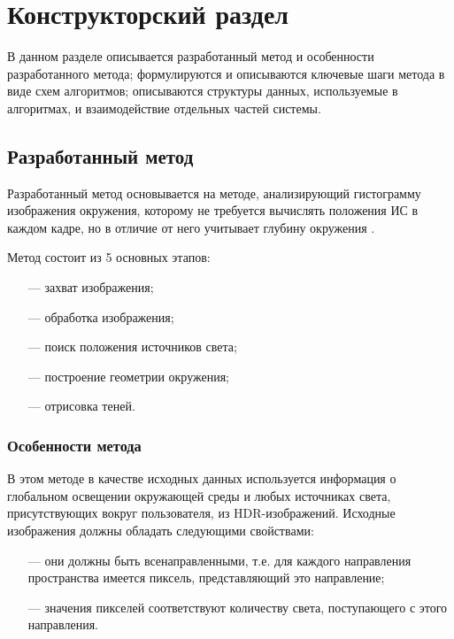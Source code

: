 \chapter{Конструкторский раздел}

В данном разделе описывается разработанный метод и особенности разработанного метода; формулируются и описываются ключевые шаги метода в виде схем алгоритмов; описываются структуры данных, используемые в алгоритмах, и взаимодействие отдельных частей системы.

\section{Разработанный метод}

Разработанный метод основывается на методе, анализирующий гистограмму изображения окружения, которому не требуется вычислять положения ИС в каждом кадре, но в отличие от него учитывает глубину окружения \cite{osti2019real}.

Метод состоит из 5 основных этапов:

\begin{enumerate}
	\item[---] захват изображения;
	\item[---] обработка изображения;
	\item[---] поиск положения источников света;
	\item[---] построение геометрии окружения;
	\item[---] отрисовка теней.
\end{enumerate}

\subsection{Особенности метода}

В этом методе в качестве исходных данных используется информация о глобальном освещении окружающей среды и любых источниках света, присутствующих вокруг пользователя, из HDR-изображений. Исходные изображения должны обладать следующими свойствами:

\begin{itemize}
	\item[---] они должны быть всенаправленными, т.е. для каждого направления пространства имеется пиксель, представляющий это направление;
	\item[---] значения пикселей соответствуют количеству света, поступающего с этого направления.
\end{itemize}


